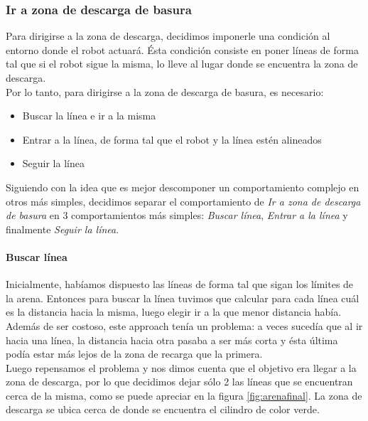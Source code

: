 \subsubsection{Ir a zona de descarga de basura}
\label{go_to_unload_zone}
Para dirigirse a la zona de descarga, decidimos imponerle una condici\'on al
entorno donde el robot actuar\'a. \'Esta condici\'on consiste en poner l\'ineas
de forma tal que si el robot sigue la misma, lo lleve al lugar donde se
encuentra la zona de descarga.
\\
Por lo tanto, para dirigirse a la zona de descarga de basura, es necesario:
\begin{itemize}
	\item Buscar la l\'inea e ir a la misma
	\item Entrar a la l\'inea, de forma tal que el robot y la l\'inea est\'en alineados
	\item Seguir la l\'inea
\end{itemize}
Siguiendo con la idea que es mejor descomponer un comportamiento complejo en otros
m\'as simples, decidimos separar el comportamiento de \emph{Ir a zona de descarga de basura}
en 3 comportamientos m\'as simples: \emph{Buscar l\'inea}, \emph{Entrar a la l\'inea} y
finalmente \emph{Seguir la l\'inea}.

\paragraph{Buscar l\'inea}
\label{find_line}
Inicialmente, hab\'iamos dispuesto las l\'ineas de forma tal que sigan los l\'imites de la
arena. Entonces para buscar la l\'inea tuvimos que calcular para cada l\'inea
cu\'al es la distancia hacia la misma, luego elegir ir a la que menor distancia hab\'ia.
Adem\'as de ser costoso, este approach ten\'ia un problema: a veces suced\'ia que al ir hacia una
l\'inea, la distancia hacia otra pasaba a ser m\'as corta y \'esta \'ultima pod\'ia estar m\'as
lejos de la zona de recarga que la primera.
\\
Luego repensamos el problema y nos dimos cuenta que el objetivo era llegar a la zona de descarga,
por lo que decidimos dejar s\'olo 2 las l\'ineas que se encuentran cerca de la misma, como se
puede apreciar en la figura \ref{fig:arenafinal}. La zona de descarga se ubica cerca de donde
se encuentra el cilindro de color verde.

